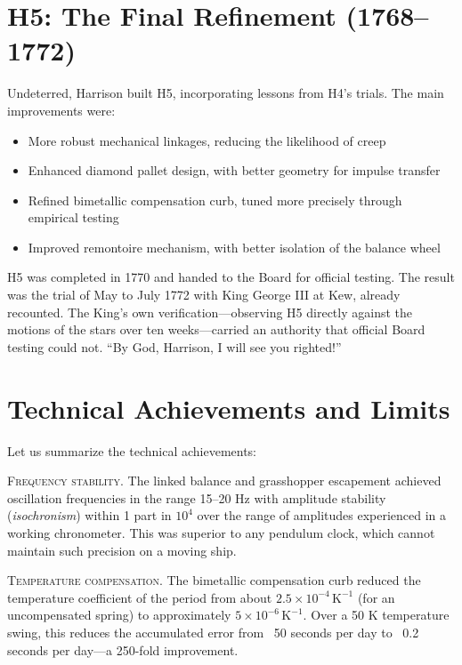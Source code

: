 \section{H5: The Final Refinement (1768--1772)}

Undeterred, Harrison built H5, incorporating lessons from H4's trials. The main improvements were:

\begin{itemize}
\item More robust mechanical linkages, reducing the likelihood of creep
\item Enhanced diamond pallet design, with better geometry for impulse transfer
\item Refined bimetallic compensation curb, tuned more precisely through empirical testing
\item Improved remontoire mechanism, with better isolation of the balance wheel
\end{itemize}

H5 was completed in 1770 and handed to the Board for official testing. The result was the trial of May to July 1772 with King George III at Kew, already recounted. The King's own verification—observing H5 directly against the motions of the stars over ten weeks—carried an authority that official Board testing could not. ``By God, Harrison, I will see you righted!''

\section{Technical Achievements and Limits}

Let us summarize the technical achievements:

\textsc{Frequency stability.} The linked balance and grasshopper escapement achieved oscillation frequencies in the range 15--20 Hz with amplitude stability (\textit{isochronism}) within 1 part in $10^4$ over the range of amplitudes experienced in a working chronometer. This was superior to any pendulum clock, which cannot maintain such precision on a moving ship.

\textsc{Temperature compensation.} The bimetallic compensation curb reduced the temperature coefficient of the period from about $2.5 \times 10^{-4} \, \text{K}^{-1}$ (for an uncompensated spring) to approximately $5 \times 10^{-6} \, \text{K}^{-1}$. Over a 50 K temperature swing, this reduces the accumulated error from ~50 seconds per day to ~0.2 seconds per day—a 250-fold improvement.

